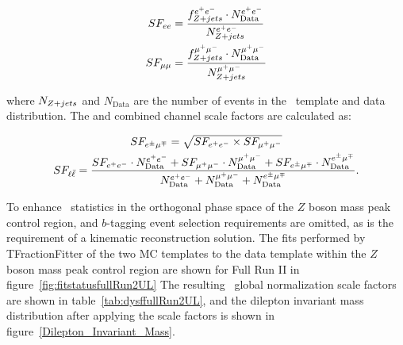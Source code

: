 \begin{linenomath*}
\begin{align}
SF_{ee} &= \frac{f_{Z+jets}^{e^{+}e^{-}} \cdot N_\text{Data}^{e^{+}e^{-}}}{N_{Z+jets}^{e^{+}e^{-}}} \\
SF_{\mu\mu} &= \frac{f_{Z+jets}^{\mu^{+}\mu^{-}} \cdot N_\text{Data}^{\mu^{+}\mu^{-}}}{N_{Z+jets}^{\mu^{+}\mu^{-}}}
\end{align}
\end{linenomath*}
where $N_{Z+jets}$ and $N_\text{Data}$ are the number of events in the \zjets\ template and data distribution.
The \emu and combined channel scale factors are calculated as:
\begin{linenomath*}
\begin{gather}
SF_{e^{\pm}\mu^{\mp}} = \sqrt{SF_{e^{+}e^{-}} \times SF_{\mu^{+}\mu^{-}}} \\
SF_{\ell \bar{\ell}} = \frac{SF_{e^{+}e^{-}} \cdot N_\text{Data}^{e^{+}e^{-}} + SF_{\mu^{+}\mu^{-}} \cdot N_\text{Data}^{\mu^{+}\mu^{-}} + SF_{e^{\pm}\mu^{\mp}} \cdot N_\text{Data}^{e^{\pm}\mu^{\mp}}}{N_\text{Data}^{e^{+}e^{-}} + N_\text{Data}^{\mu^{+}\mu^{-}} + N_\text{Data}^{e^{\pm}\mu^{\mp}}}.
\end{gather}
\end{linenomath*}
To enhance \zjets\ statistics in the orthogonal phase space of the $Z$ boson mass peak control region, \MET and $b$-tagging event selection requirements are omitted, as is the requirement of a kinematic reconstruction solution.
The fits performed by TFractionFitter of the two MC templates to the data template within the $Z$ boson mass peak control region are shown for Full Run II in figure~\ref{fig:fitstatusfullRun2UL}
The resulting \zjets\ global normalization scale factors are shown in table~\ref{tab:dysffullRun2UL}, and the dilepton invariant mass distribution after applying the scale factors is shown in figure~\ref{Dilepton_Invariant_Mass}.

